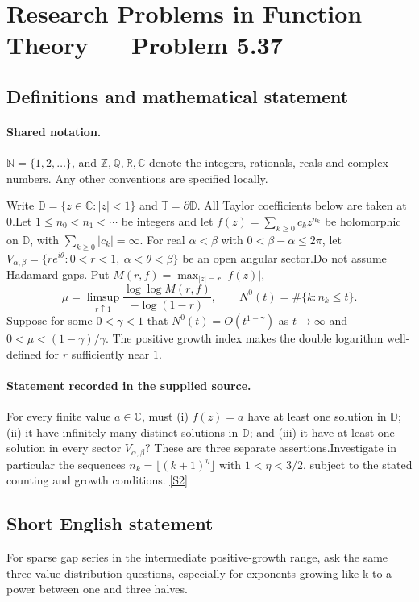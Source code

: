 \documentclass[11pt]{article}
\newcommand{\sref}[2]{\hyperlink{source:#1:#2}{[S#2]}}
\begin{document}
\section{Research Problems in Function Theory — Problem 5.37}\label{statement}

\subsection{Definitions and mathematical statement}

\paragraph{Shared notation.}$\mathbb N=\{1,2,\ldots\}$, and $\mathbb Z,\mathbb Q,\mathbb R,\mathbb C$ denote the integers, rationals, reals and complex numbers. Any other conventions are specified locally.


Write $\mathbb D=\{z\in\mathbb C:|z|<1\}$ and $\mathbb T=\partial\mathbb D$. All Taylor coefficients below are taken at $0$.Let $1\le n_0<n_1<\cdots$ be integers and let $f(z)=\sum_{k\ge0}c_kz^{n_k}$ be holomorphic on $\mathbb D$, with $\sum_{k\ge0}|c_k|=\infty$. For real $\alpha<\beta$ with $0<\beta-\alpha\le2\pi$, let $V_{\alpha,\beta}=\{re^{i\theta}:0<r<1,\ \alpha<\theta<\beta\}$ be an open angular sector.Do not assume Hadamard gaps. Put $M(r,f)=\max_{|z|=r}|f(z)|$,
\[\mu=\limsup_{r\uparrow1}\frac{\log\log M(r,f)}{-\log(1-r)},\qquad N^0(t)=\#\{k:n_k\le t\}.
\]
Suppose for some $0<\gamma<1$ that $N^0(t)=O(t^{1-\gamma})$ as $t\to\infty$ and $0<\mu<(1-\gamma)/\gamma$. The positive growth index makes the double logarithm well-defined for $r$ sufficiently near $1$.
\paragraph{Statement recorded in the supplied source.}
For every finite value $a\in\mathbb C$, must (i) $f(z)=a$ have at least one solution in $\mathbb D$; (ii) it have infinitely many distinct solutions in $\mathbb D$; and (iii) it have at least one solution in every sector $V_{\alpha,\beta}$? These are three separate assertions.Investigate in particular the sequences $n_k=\lfloor(k+1)^\eta\rfloor$ with $1<\eta<3/2$, subject to the stated counting and growth conditions. \sref{statement}{2}
\subsection{Short English statement}
For sparse gap series in the intermediate positive-growth range, ask the same three value-distribution questions, especially for exponents growing like k to a power between one and three halves.
\end{document}
